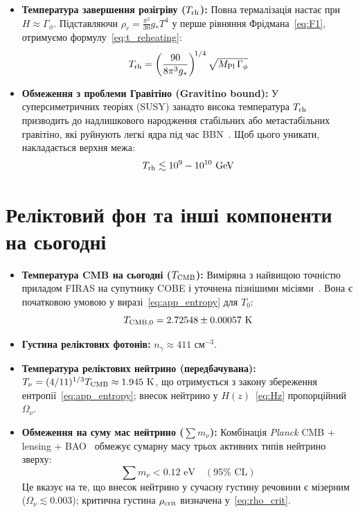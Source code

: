\begin{itemize}
    \item \textbf{Температура завершення розігріву ($T_{\rm rh}$):}
    Повна термалізація настає при $H \approx \Gamma_\phi$. Підставляючи $\rho_r = \frac{\pi^2}{30}g_* T^4$ у перше рівняння Фрідмана~\eqref{eq:F1}, отримуємо формулу~\eqref{eq:t_reheating}:
    \[ T_{\rm rh} = \left(\frac{90}{8\pi^3 g_*}\right)^{\!1/4} \sqrt{M_{\rm Pl}\,\Gamma_\phi} \]

    \item \textbf{Обмеження з проблеми Гравітіно (Gravitino bound):}
    У суперсиметричних теоріях (SUSY) занадто висока температура $T_{\rm rh}$ призводить до надлишкового народження стабільних або метастабільних гравітіно, які руйнують легкі ядра під час BBN~\cite{kofman_1997}. Щоб цього уникати, накладається верхня межа:
    \[ T_{\rm rh} \lesssim 10^9 - 10^{10} \text{ GeV} \]
\end{itemize}

\section{Реліктовий фон та інші компоненти на сьогодні}

\begin{itemize}
    \item \textbf{Температура CMB на сьогодні ($T_{\rm CMB}$):} Виміряна з найвищою точністю приладом FIRAS на супутнику COBE і уточнена пізнішими місіями~\cite{planck_2018}. Вона є початковою умовою у виразі~\eqref{eq:app_entropy} для $T_0$:
    \[ T_{\rm CMB, 0} = 2.72548 \pm 0.00057 \text{ K} \]
    \item \textbf{Густина реліктових фотонів:} $n_\gamma \approx 411 \text{ см}^{-3}$.
    \item \textbf{Температура реліктових нейтрино (передбачувана):} \\
    $T_\nu = (4/11)^{1/3} T_{\rm CMB} \approx 1.945 \text{ K}$, що отримується з закону збереження ентропії~\eqref{eq:app_entropy}; внесок нейтрино у $H(z)$~\eqref{eq:Hz} пропорційний $\Omega_\nu$.
    \item \textbf{Обмеження на суму мас нейтрино ($\sum m_\nu$):} Комбінація \textit{Planck} CMB + lensing + BAO~\cite{planck_2018,eisenstein_2005} обмежує сумарну масу трьох активних типів нейтрино зверху:
    \[ \sum m_\nu < 0.12 \text{ eV} \quad (95\% \text{ CL}) \]
    Це вказує на те, що внесок нейтрино у сучасну густину речовини є мізерним ($\Omega_\nu \lesssim 0.003$); критична густина $\rho_{\rm crit}$ визначена у~\eqref{eq:rho_crit}.
\end{itemize}